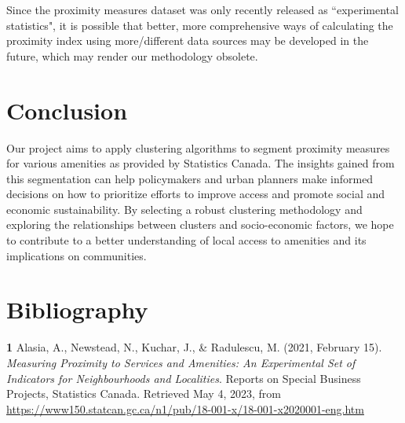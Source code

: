 \documentclass[11pt, a4paper]{article}
\newcommand{\comment}[1]{}
\begin{document}
Since the proximity measures dataset was only recently released as ``experimental statistics", it is possible that better, more comprehensive ways of calculating the proximity index using more/different data sources may be developed in the future, which may render our methodology obsolete. 

\comment{
\begin{enumerate}
\item Since the proximity measures dataset was only recently released as ``experimental statistics", it is possible that better, more comprehensive ways of calculating the proximity index using more/different data sources may be developed in the future, which may render our methodology obsolete.
\end{enumerate}
}





\section*{Conclusion}


Our project aims to apply clustering algorithms to segment proximity measures for various amenities as provided by Statistics Canada. The insights gained from this segmentation can help policymakers and urban planners make informed decisions on how to prioritize efforts to improve access and promote social and economic sustainability. By selecting a robust clustering methodology and exploring the relationships between clusters and socio-economic factors, we hope to contribute to a better understanding of local access to amenities and its implications on communities.





\pagebreak
\section*{Bibliography}


\noindent\textbf{1} Alasia, A., Newstead, N., Kuchar, J., \& Radulescu, M. (2021, February 15). \textit{Measuring Proximity to Services and Amenities: An Experimental Set of Indicators for Neighbourhoods and Localities}. Reports on Special Business Projects, Statistics Canada. Retrieved May 4, 2023, from \sloppy\url{https://www150.statcan.gc.ca/n1/pub/18-001-x/18-001-x2020001-eng.htm}  \\ 
\end{document}
